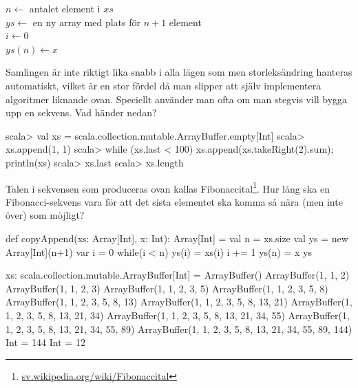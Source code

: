 \begin{algorithm}[H]

 $n \leftarrow$ antalet element i $xs$ \\
 $ys \leftarrow$ en ny array med plats för $n + 1$ element\\
 $i \leftarrow 0$  \\
 $ys(n) \leftarrow x$
\end{algorithm}



\Subtask Samlingen  är inte riktigt lika snabb i alla lägen som  men storleksändring hanteras automatiskt, vilket är en stor fördel då man slipper att själv implementera algoritmer liknande  ovan. Speciellt använder man ofta  om man stegvis vill bygga upp en sekvens. Vad händer nedan?
\begin{REPL}
scala> val xs = scala.collection.mutable.ArrayBuffer.empty[Int]
scala> xs.append(1, 1)
scala> while (xs.last < 100) {xs.append(xs.takeRight(2).sum); println(xs)}
scala> xs.last
scala> xs.length
\end{REPL}

\Subtask Talen i sekvensen som produceras ovan kallas Fibonaccital\footnote{\href{https://sv.wikipedia.org/wiki/Fibonaccital}{sv.wikipedia.org/wiki/Fibonaccital}}. Hur lång ska en Fibonacci-sekvens vara för att det sista elementet ska komma så nära (men inte över)  som möjligt?



\SOLUTION


\TaskSolved \what


\SubtaskSolved  \begin{Code}
def copyAppend(xs: Array[Int], x: Int): Array[Int] = {
  val n = xs.size
  val ys = new Array[Int](n+1)
  var i = 0
  while(i < n) {
    ys(i) = xs(i)
    i += 1
  }
  ys(n) = x
  ys
}
\end{Code}

\SubtaskSolved  \begin{REPL}
xs: scala.collection.mutable.ArrayBuffer[Int] = ArrayBuffer()
ArrayBuffer(1, 1, 2)
ArrayBuffer(1, 1, 2, 3)
ArrayBuffer(1, 1, 2, 3, 5)
ArrayBuffer(1, 1, 2, 3, 5, 8)
ArrayBuffer(1, 1, 2, 3, 5, 8, 13)
ArrayBuffer(1, 1, 2, 3, 5, 8, 13, 21)
ArrayBuffer(1, 1, 2, 3, 5, 8, 13, 21, 34)
ArrayBuffer(1, 1, 2, 3, 5, 8, 13, 21, 34, 55)
ArrayBuffer(1, 1, 2, 3, 5, 8, 13, 21, 34, 55, 89)
ArrayBuffer(1, 1, 2, 3, 5, 8, 13, 21, 34, 55, 89, 144)
Int = 144
Int = 12
\end{REPL}

